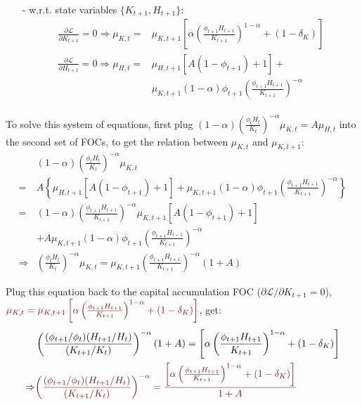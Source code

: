 \documentclass[10pt,landscape,a4paper]{article}
\begin{document}
\begin{multicols*}{4}
\begin{itemize}
    \item[-] w.r.t. state variables $\{K_{t+1},H_{t+1}\}$:
    \begin{align*}
        \frac{\partial \mathcal{L}}{\partial K_{t+1}} =0\Rightarrow  \mu_{K,t}=&\mu_{K,t+1}\left[\alpha\left( \frac{\phi_{t+1}H_{t+1}}{K_{t+1}}\right)^{1-\alpha} + (1-\delta_K)  \right]\\
        \frac{\partial \mathcal{L}}{\partial H_{t+1}}=0\Rightarrow \mu_{H,t}=&\mu_{H,t+1}\left[A(1-\phi_{t+1})+1\right]+\\
         &\mu_{K,t+1}(1-\alpha)\phi_{t+1}\left(\frac{\phi_{t+1}H_{t+1}}{K_{t+1}}\right)^{-\alpha}\\
    \end{align*}
\end{itemize}

To solve this system of equations, first plug $(1-\alpha)\left(\frac{\phi_t H_t}{K_t}\right)^{-\alpha}\mu_{K,t}=A\mu_{H,t}$ into the second set of FOCs, to get the relation between $\mu_{K,t}$ and $\mu_{K,t+1}$:
\begin{align*}
    &(1-\alpha)\left(\frac{\phi_t H_t}{K_t}\right)^{-\alpha}\mu_{K,t}\\
    = & A\left\{ \mu_{H,t+1}\left[A(1-\phi_{t+1})+1\right]+\mu_{K,t+1}(1-\alpha)\phi_{t+1}\left(\frac{\phi_{t+1}H_{t+1}}{K_{t+1}}\right)^{-\alpha} \right\} \\
    = & (1-\alpha)\left(\frac{\phi_{t+1}H_{t+1}}{K_{t+1}}\right)^{-\alpha}\mu_{K,t+1}\left[A(1-\phi_{t+1})+1\right]\\
    &+ A \mu_{K,t+1}(1-\alpha)\phi_{t+1}\left(\frac{\phi_{t+1}H_{t+1}}{K_{t+1}}\right)^{-\alpha}\\
    \Rightarrow & \left(\frac{\phi_t H_t}{K_t}\right)^{-\alpha}\mu_{K,t} = \mu_{K,t+1}\left(\frac{\phi_{t+1}H_{t+1}}{K_{t+1}}\right)^{-\alpha}(1+A)
\end{align*}

Plug this equation back to the capital accumulation FOC ($\partial \mathcal{L}/\partial K_{t+1}=0$), ${\color{myred}\mu_{K,t}=\mu_{K,t+1}\left[\alpha\left( \frac{\phi_{t+1}H_{t+1}}{K_{t+1}}\right)^{1-\alpha} + (1-\delta_K)  \right]}$, get: 
\begin{align*}
    &\left(\frac{(\phi_{t+1}/\phi_t)(H_{t+1}/H_t)}{(K_{t+1}/K_t)}\right)^{-\alpha}(1+A) = \left[\alpha\left( \frac{\phi_{t+1}H_{t+1}}{K_{t+1}}\right)^{1-\alpha} + (1-\delta_K)  \right]\\
    \Rightarrow & {\color{myred}\left(\frac{(\phi_{t+1}/\phi_t)(H_{t+1}/H_t)}{(K_{t+1}/K_t)}\right)^{-\alpha}=\frac{\left[\alpha\left( \frac{\phi_{t+1}H_{t+1}}{K_{t+1}}\right)^{1-\alpha} + (1-\delta_K)  \right]}{1+A}}
\end{align*}


\end{multicols*}
\end{document}
